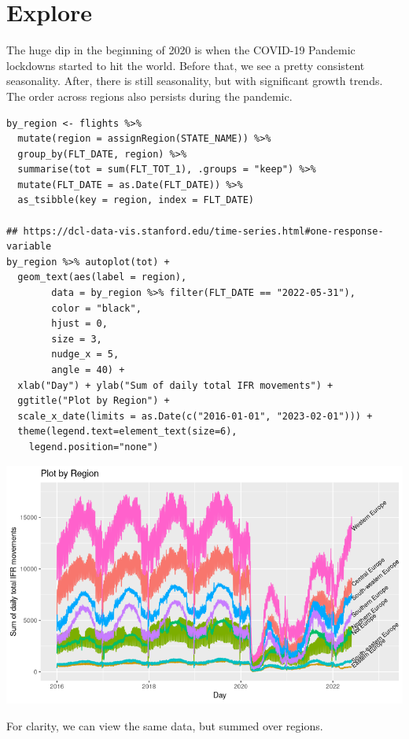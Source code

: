 \documentclass[8pt]{article}
\begin{document}
\section{Explore}
\label{sec:org51c57d1}

The huge dip in the beginning of 2020 is when the COVID-19 Pandemic lockdowns started to hit the world. Before that, we see a pretty consistent seasonality. After, there is still seasonality, but with significant growth trends. The order across regions also persists during the pandemic.

\begin{verbatim}
by_region <- flights %>%
  mutate(region = assignRegion(STATE_NAME)) %>%
  group_by(FLT_DATE, region) %>%
  summarise(tot = sum(FLT_TOT_1), .groups = "keep") %>%
  mutate(FLT_DATE = as.Date(FLT_DATE)) %>%
  as_tsibble(key = region, index = FLT_DATE)

## https://dcl-data-vis.stanford.edu/time-series.html#one-response-variable
by_region %>% autoplot(tot) +
  geom_text(aes(label = region),
	    data = by_region %>% filter(FLT_DATE == "2022-05-31"),
	    color = "black",
	    hjust = 0,
	    size = 3,
	    nudge_x = 5,
	    angle = 40) +
  xlab("Day") + ylab("Sum of daily total IFR movements") +
  ggtitle("Plot by Region") +
  scale_x_date(limits = as.Date(c("2016-01-01", "2023-02-01"))) +
  theme(legend.text=element_text(size=6),
	legend.position="none")
\end{verbatim}

\begin{center}
\includegraphics[width=.9\linewidth]{./media/tot_region.png}
\end{center}

\begin{latex}
\pagebreak
\end{latex}

For clarity, we can view the same data, but summed over regions.
\end{document}
